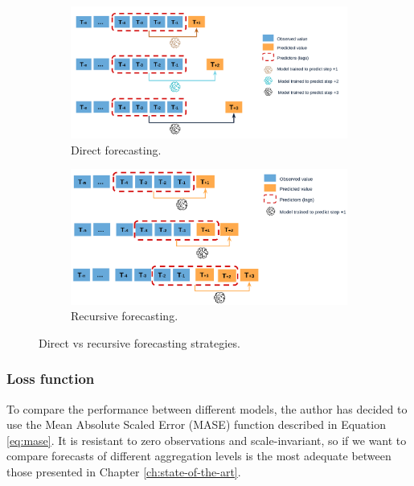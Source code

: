 \begin{figure}[H]
\centering
    \begin{subfigure}{.45\textwidth}
        \centering
        \includegraphics[width=1\linewidth]{images/methodology/direct-multi-step-forecasting}
        \caption{Direct forecasting.}
    \end{subfigure}
    \begin{subfigure}{.45\textwidth}
        \centering
        \includegraphics[width=1\linewidth]{images/methodology/recursive-mutistep-forecasting}
        \caption{Recursive forecasting.}
    \end{subfigure}

    \caption{Direct vs recursive forecasting strategies.}
    \label{fig:direct-recursive-forecasting}
\end{figure}

\subsubsection{Loss function}
To compare the performance between different models, the author has decided to use the Mean Absolute Scaled Error (MASE) function described in Equation \ref{eq:mase}. It is resistant to zero observations and scale-invariant, so if we want to compare forecasts of different aggregation levels is the most adequate between those presented in Chapter \ref{ch:state-of-the-art}.

